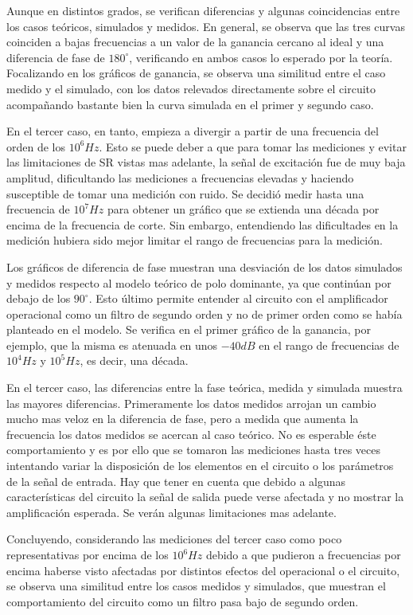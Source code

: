 Aunque en distintos grados, se verifican diferencias y algunas coincidencias entre los casos teóricos, simulados y medidos. En general, se observa que las tres curvas coinciden a bajas frecuencias a un valor de la ganancia cercano al ideal y una diferencia de fase de $180^{\circ}$, verificando en ambos casos lo esperado por la teoría. 
Focalizando en los gráficos de ganancia, se observa una similitud entre el caso medido y el simulado, con los datos relevados directamente sobre el circuito acompañando bastante bien la curva simulada en el primer y segundo caso. 

En el tercer caso, en tanto, empieza a divergir a partir de una frecuencia del orden de los $10^{6} Hz$. Esto se puede deber a que para tomar las mediciones y evitar las limitaciones de SR vistas mas adelante, la señal de excitación fue de muy baja amplitud, dificultando las mediciones a frecuencias elevadas y haciendo susceptible de tomar una medición con ruido. Se decidió medir hasta una frecuencia de $10^{7} Hz$ para obtener un gráfico que se extienda una década por encima de la frecuencia de corte. Sin embargo, entendiendo las dificultades en la medición hubiera sido mejor limitar el rango de frecuencias para la medición.

Los gráficos de diferencia de fase muestran una desviación de los datos simulados y medidos respecto al modelo teórico de polo dominante, ya que continúan por debajo de los $90^{\circ}$. Esto último permite entender al circuito con el amplificador operacional como un filtro de segundo orden y no de primer orden como se había planteado en el modelo. Se verifica en el primer gráfico de la ganancia, por ejemplo, que la misma es atenuada en unos $-40dB$ en el rango de frecuencias de $10^{4} Hz$ y $10^{5} Hz$, es decir, una década. 

En el tercer caso, las diferencias entre la fase teórica, medida y simulada muestra las mayores diferencias. Primeramente los datos medidos arrojan un cambio mucho mas veloz en la diferencia de fase, pero a medida que aumenta la frecuencia los datos medidos se acercan al caso teórico. No es esperable éste comportamiento y es por ello que se tomaron las mediciones hasta tres veces intentando variar la disposición de los elementos en el circuito o los parámetros de la señal de entrada. Hay que tener en cuenta que debido a algunas características del circuito la señal de salida puede verse afectada y no mostrar la amplificación esperada. Se verán algunas limitaciones mas adelante. 

Concluyendo, considerando las mediciones del tercer caso como poco representativas por encima de los $10^{6} Hz$ debido a que pudieron a frecuencias por encima  haberse visto afectadas por distintos efectos del operacional o el circuito, se observa una similitud entre los casos medidos y simulados, que muestran el comportamiento del circuito como un filtro pasa bajo de segundo orden. 


